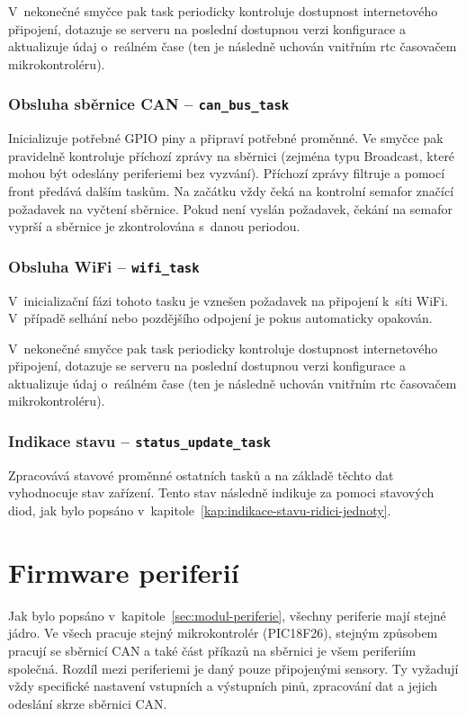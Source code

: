             V~nekonečné smyčce pak task periodicky kontroluje dostupnost internetového připojení, dotazuje se serveru na poslední dostupnou verzi konfigurace a aktualizuje údaj o~reálném čase (ten je následně uchován vnitřním \acs{rtc} časovačem mikrokontroléru).

        \subsubsection{Obsluha sběrnice CAN --  \texttt{can\_bus\_task}}
            Inicializuje potřebné GPIO piny a připraví potřebné proměnné. Ve smyčce pak pravidelně kontroluje příchozí zprávy na sběrnici (zejména typu Broadcast, které mohou být odeslány periferiemi bez vyzvání). Příchozí zprávy filtruje a pomocí front předává dalším taskům. Na začátku vždy čeká na kontrolní semafor značící požadavek na vyčtení sběrnice. Pokud není vyslán požadavek, čekání na semafor vyprší a sběrnice je zkontrolována s~danou periodou.

            \subsubsection{Obsluha WiFi --  \texttt{wifi\_task}}
            V~inicializační fázi tohoto tasku je vznešen požadavek na připojení k~síti WiFi. V~případě selhání nebo pozdějšího odpojení je pokus automaticky opakován. 
            
            V~nekonečné smyčce pak task periodicky kontroluje dostupnost internetového připojení, dotazuje se serveru na poslední dostupnou verzi konfigurace a aktualizuje údaj o~reálném čase (ten je následně uchován vnitřním \acs{rtc} časovačem mikrokontroléru).

        \subsubsection{Indikace stavu --  \texttt{status\_update\_task}}
            Zpracovává stavové proměnné ostatních tasků a na základě těchto dat vyhodnocuje stav zařízení. Tento stav následně indikuje za pomoci stavových diod, jak bylo popsáno v~kapitole~\ref{kap:indikace-stavu-ridici-jednoty}.



\section{Firmware periferií}
    Jak bylo popsáno v~kapitole~\ref{sec:modul-periferie}, všechny periferie mají stejné jádro. Ve všech pracuje stejný mikrokontrolér (PIC18F26), stejným způsobem pracují se sběrnicí CAN a také část příkazů na sběrnici je všem periferiím společná. Rozdíl mezi periferiemi je daný pouze připojenými sensory. Ty vyžadují vždy specifické nastavení vstupních a výstupních pinů, zpracování dat a jejich odeslání skrze sběrnici CAN. 

